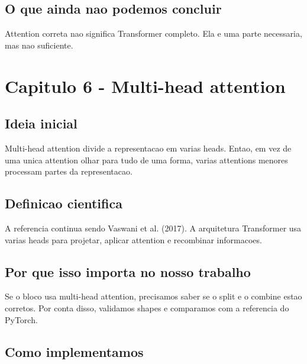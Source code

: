 \subsection{O que ainda nao podemos concluir}




Attention correta nao significa Transformer completo. Ela e uma parte necessaria, mas nao suficiente.



\section{Capitulo 6 - Multi-head attention}



\subsection{Ideia inicial}





Multi-head attention divide a representacao em varias heads. Entao, em vez de uma unica attention olhar para tudo de uma forma, varias attentions menores processam partes da representacao.



\subsection{Definicao cientifica}




A referencia continua sendo Vaswani et al. (2017). A arquitetura Transformer usa varias heads para projetar, aplicar attention e recombinar informacoes.



\subsection{Por que isso importa no nosso trabalho}





Se o bloco usa multi-head attention, precisamos saber se o split e o combine estao corretos. Por conta disso, validamos shapes e comparamos com a referencia do PyTorch.



\subsection{Como implementamos}



